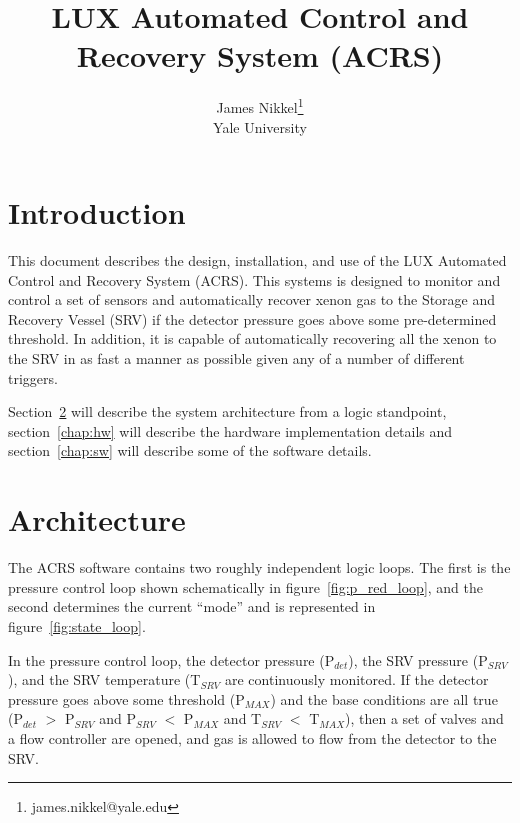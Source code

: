 \documentclass[12pt]{article}
\title{LUX Automated Control and Recovery System (ACRS)}
\author{James Nikkel\thanks{james.nikkel@yale.edu} \\
  Yale University}
\begin{document}
\maketitle

\tableofcontents

\section{Introduction}

This document describes the design,  installation, and use of the LUX Automated Control and Recovery System (ACRS).  This systems is designed to monitor and control a set of sensors and automatically recover xenon gas to the Storage and Recovery Vessel (SRV) if the detector pressure goes above some pre-determined threshold.  In addition, it is capable of automatically recovering all the xenon to the SRV in as fast a manner as possible given any of a number of different triggers.  

Section~\ref{chap:arch} will describe the system architecture from a logic standpoint, section~\ref{chap:hw} will describe the hardware implementation details and section~\ref{chap:sw} will describe some of the software details.

\section{Architecture}
\label{chap:arch}

The ACRS software contains two roughly independent logic loops.  The first is the pressure control loop shown schematically in figure~\ref{fig:p_red_loop}, and the second determines the current ``mode'' and is represented in figure~\ref{fig:state_loop}.  

In the pressure control loop,  the detector pressure (P$_{det}$),  the SRV pressure (P$_{SRV}$), and the SRV temperature (T$_{SRV}$ are continuously monitored.  If the detector pressure goes above some threshold (P$_{MAX}$) and the base conditions are all true (P$_{det}$ $>$ P$_{SRV}$ and P$_{SRV}$ $<$ P$_{MAX}$ and T$_{SRV}$ $<$ T$_{MAX}$), then a set of valves and a flow controller are opened, and gas is allowed to flow from the detector to the SRV.  
\end{document}
